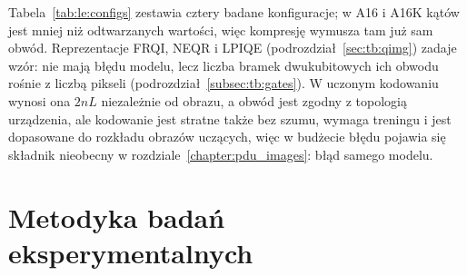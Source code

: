 Tabela~\ref{tab:le:configs} zestawia cztery badane konfiguracje; w A16 i A16K kątów jest mniej niż odtwarzanych wartości, więc kompresję wymusza tam już sam obwód.
Reprezentacje FRQI, NEQR i LPIQE (podrozdział~\ref{sec:tb:qimg}) zadaje wzór: nie mają błędu modelu, lecz liczba bramek dwukubitowych ich obwodu rośnie z liczbą pikseli (podrozdział~\ref{subsec:tb:gates}).
W uczonym kodowaniu wynosi ona $2nL$ niezależnie od obrazu, a obwód jest zgodny z topologią urządzenia, ale kodowanie jest stratne także bez szumu, wymaga treningu i jest dopasowane do rozkładu obrazów uczących, więc w budżecie błędu pojawia się składnik nieobecny w rozdziale~\ref{chapter:pdu_images}: błąd samego modelu.

\section{Metodyka badań eksperymentalnych}\label{sec:le:methodology}
